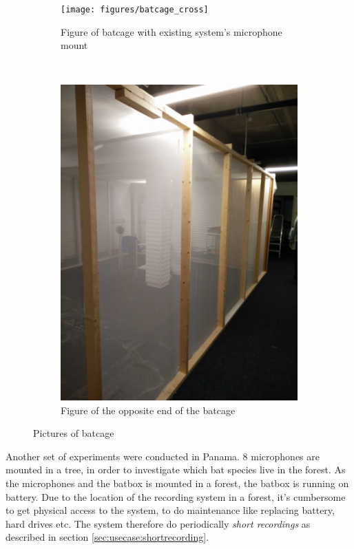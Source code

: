 \begin{figure}[!h]
    \centering
    \begin{subfigure}[b]{0.45\textwidth}
        \texttt{[image: figures/batcage\_cross]}
        \caption{Figure of batcage with existing system's microphone mount}
        \label{fig:gull}
    \end{subfigure}
    ~ %
    \begin{subfigure}[b]{0.45\textwidth}
        \includegraphics[width=\textwidth]{figures/batcage}
        \caption{Figure of the opposite end of the batcage}
        \label{fig:mouse}
    \end{subfigure}
    \caption{Pictures of batcage}\label{fig:usecase:batcage}
\end{figure}

Another set of experiments were conducted in Panama. 8 microphones are mounted in a tree, in order to investigate which bat species live in the forest. As the microphones and the batbox is mounted in a forest, the batbox is running on battery. Due to the location of the recording system in a forest, it's cumbersome to get physical access to the system, to do maintenance like replacing battery, hard drives etc. The system therefore do periodically \textit{short recordings} as described in section \ref{sec:usecase:shortrecording}. 

